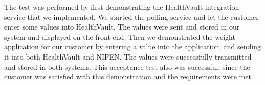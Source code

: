 The test was performed by first demonstrating the HealthVault integration service that we implemented.
We started the polling service and let the customer enter some values into HealthVault.
The values were sent and stored in our system and displayed on the front-end.
Then we demonstrated the weight application for our customer by entering a value into the application, and sending it into both HealthVault and NIPEN.
The values were successfully transmitted and stored in both systems.
This acceptance test also was successful, since the customer was satisfied with this demonstration and the requirements were met.


